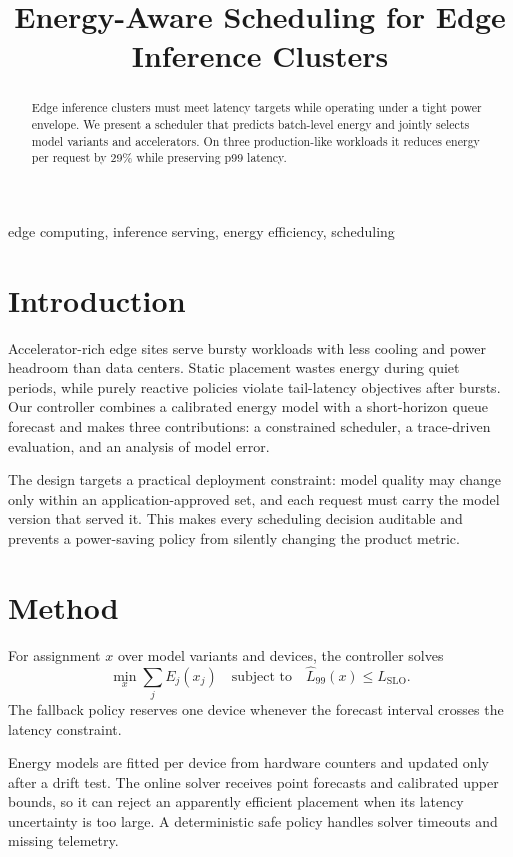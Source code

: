 \documentclass[conference]{IEEEtran}
\title{Energy-Aware Scheduling for Edge Inference Clusters}
\author{
\IEEEauthorblockN{Mina Okafor, Luca Bianchi, and Hana Sato}
\IEEEauthorblockA{Department of Electrical and Computer Engineering\\
Northgate Institute of Technology\\
\{mina.okafor,luca.bianchi,hana.sato\}@example.edu}
}
\begin{document}
\maketitle

\begin{abstract}
Edge inference clusters must meet latency targets while operating under a
tight power envelope. We present a scheduler that predicts batch-level energy
and jointly selects model variants and accelerators. On three production-like
workloads it reduces energy per request by 29\% while preserving p99 latency.
\end{abstract}

\begin{IEEEkeywords}
edge computing, inference serving, energy efficiency, scheduling
\end{IEEEkeywords}

\section{Introduction}
Accelerator-rich edge sites serve bursty workloads with less cooling and power
headroom than data centers. Static placement wastes energy during quiet periods,
while purely reactive policies violate tail-latency objectives after bursts.
Our controller combines a calibrated energy model with a short-horizon queue
forecast and makes three contributions: a constrained scheduler, a trace-driven
evaluation, and an analysis of model error.

The design targets a practical deployment constraint: model quality may change
only within an application-approved set, and each request must carry the model
version that served it. This makes every scheduling decision auditable and
prevents a power-saving policy from silently changing the product metric.

\section{Method}
For assignment $x$ over model variants and devices, the controller solves
\begin{equation}
  \min_x \sum_{j} E_j(x_j)
  \quad \text{subject to} \quad
  \widehat L_{99}(x) \leq L_{\mathrm{SLO}} .
\end{equation}
The fallback policy reserves one device whenever the forecast interval crosses
the latency constraint.

Energy models are fitted per device from hardware counters and updated only
after a drift test. The online solver receives point forecasts and calibrated
upper bounds, so it can reject an apparently efficient placement when its
latency uncertainty is too large. A deterministic safe policy handles solver
timeouts and missing telemetry.
\end{document}
